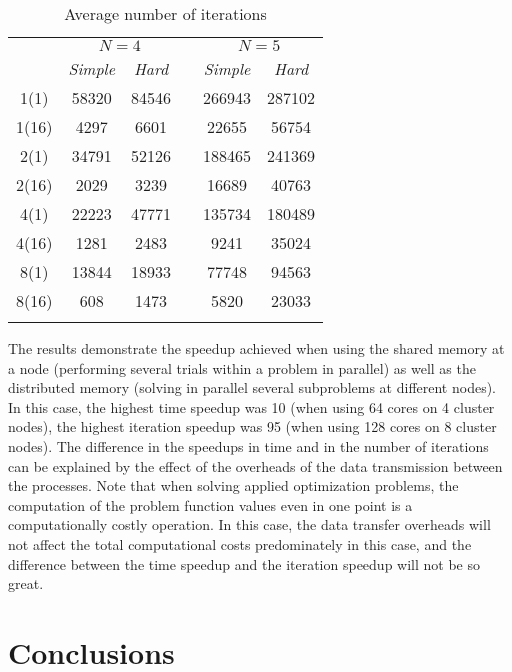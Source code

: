 \documentclass[smallextended]{svjour3}       %
\begin{document}
\begin{table}
	\caption{Average number of iterations}
	\label{tab:2}
	\center
	\begin{tabular}{cccccc}
		\hline\noalign{\smallskip}
		\multirow{2}{*}{\textit{Node(core)}}	 & \multicolumn{2}{c}{ $N=4$ } & & \multicolumn{2}{c}{$N=5$} \\
		\noalign{\smallskip} \cline{2-3} \cline{5-6} \noalign{\smallskip}
		 & \textit{Simple} & \textit{Hard} & & \textit{Simple} & \textit{Hard}  \\
		\noalign{\smallskip} \hline \noalign{\smallskip}
1(1)	&	58320	&	84546	&	&	266943	&	287102	\\
1(16)	&	4297	&	6601	&	&	22655	&	56754	\\
2(1)	&	34791	&	52126	&	&	188465	&	241369	\\
2(16)	&	2029	&	3239	&	&	16689	&	40763	\\
4(1)	&	22223	&	47771	&	&	135734	&	180489	\\
4(16)	&	1281	&	2483	&	&	9241	&	35024	\\
8(1)	&	13844	&	18933	&	&	77748	&	94563	\\
8(16)	&	608	&	1473	&	&	5820	&	23033	\\
		\noalign{\smallskip}\hline
	\end{tabular}
\end{table}


The results demonstrate the speedup achieved when using the shared memory at a node (performing several trials within a problem in parallel) as well as the distributed memory (solving in parallel several subproblems at different nodes). In this case, the highest time speedup was 10 (when using 64 cores on 4 cluster nodes), the highest iteration speedup was 95 (when using 128 cores on 8 cluster nodes). The difference in the speedups in time and in the number of iterations can be explained by the effect of the overheads of the data transmission between the processes. Note that when solving applied optimization problems, the computation of the problem function values even in one point is a computationally costly operation. In this case, the data transfer overheads will not affect the total computational costs predominately in this case, and the difference between the time speedup and the iteration speedup will not be so great.

\section{Conclusions}
\label{sec:5}
\end{document}
